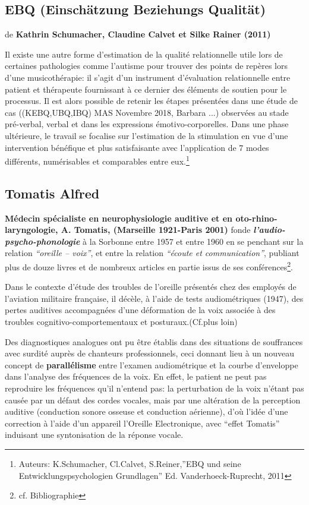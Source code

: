 \subsection{EBQ (Einschätzung Beziehungs Qualität)}
de \textbf{Kathrin Schumacher, Claudine Calvet et Silke Rainer (2011)}


Il existe une autre forme d'estimation de la qualité relationnelle
utile lors de certaines pathologies comme l'autisme pour trouver des
points de repères lors d'une musicothérapie: il s'agit d'un instrument d'évaluation relationnelle entre patient et
thérapeute fournissant à ce dernier des éléments de soutien pour le
processus. Il est alors possible de retenir les étapes présentées dans une étude de cas
((KEBQ,UBQ,IBQ) MAS Novembre 2018,
Barbara ...) observées au stade pré-verbal, verbal et dans les expressions
émotivo-corporelles.
Dans une phase ultérieure, le travail se focalise sur l'estimation de
la stimulation en vue d'une intervention bénéfique et plus
satisfaisante avec l'application de 7 modes différents, numérisables
et comparables entre eux.\footnote{ Auteurs: K.Schumacher,
  Cl.Calvet, S.Reiner,''EBQ und seine Entwicklungspsychologien Grundlagen'' Ed. Vanderhoeck-Ruprecht, 2011 } 




  



  
\subsection{Tomatis Alfred}

\textbf{Médecin spécialiste en neurophysiologie auditive et en
oto-rhino-laryngologie, A. Tomatis, (Marseille 1921-Paris 2001) } fonde
\textit{\textbf{l'audio-psycho-phonologie }} à la Sorbonne entre 
1957 et entre 1960 en  se penchant sur la relation 
\textit{``oreille -- voix''}, et entre la relation \textit{``écoute
et communication''}, publiant plus de douze livres et de nombreux
articles en partie issus de ses
conférences\footnote{cf. Bibliographie}.

Dans le contexte d'étude des troubles de
l'oreille présentés chez des employés de l'aviation militaire
française, il décèle, à l'aide
de tests audiométriques
 (1947), des pertes auditives accompagnées d'une
déformation de la voix associée à des troubles
cognitivo-comportementaux et posturaux.(Cf.plus loin)

Des diagnostiques analogues ont pu être établis dans des situations
de souffrances avec surdité auprès de chanteurs professionnels,
ceci donnant lieu
à un nouveau concept de
\textbf{parallélisme } entre l'examen audiométrique et la courbe
d'enveloppe dans l'analyse des fréquences de la voix.
En effet, le patient ne peut pas reproduire les fréquences qu'il
n'entend pas: 
la perturbation de la voix n'étant pas causée par un défaut des cordes
vocales, mais par une altération de la perception auditive (conduction
sonore osseuse et conduction aérienne), d'où
l'idée d'une correction à l'aide d'un appareil l'Oreille
Electronique, avec ``effet Tomatis'' induisant
une syntonisation de la réponse vocale.

